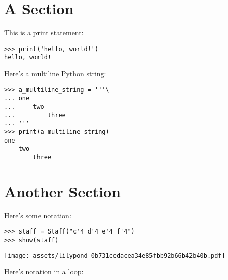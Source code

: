 \documentclass{article}
\begin{document}
\section{A Section}

This is a print statement:

\begin{comment}
<abjad>
print('hello, world!')
</abjad>
\end{comment}

\begin{singlespacing}
\begin{lstlisting}
>>> print('hello, world!')
hello, world!
\end{lstlisting}
\end{singlespacing}

Here's a multiline Python string:

\begin{comment}
<abjad>
a_multiline_string = '''\
one
    two
        three
'''
print(a_multiline_string)
</abjad>
\end{comment}

\begin{singlespacing}
\begin{lstlisting}
>>> a_multiline_string = '''\
... one
...     two
...         three
... '''
>>> print(a_multiline_string)
one
    two
        three
\end{lstlisting}
\end{singlespacing}

\section{Another Section}

Here's some notation:

\begin{comment}
<abjad>
staff = Staff("c'4 d'4 e'4 f'4")
show(staff)
</abjad>
\end{comment}

\begin{singlespacing}
\begin{lstlisting}
>>> staff = Staff("c'4 d'4 e'4 f'4")
>>> show(staff)
\end{lstlisting}
\noindent\texttt{[image: assets/lilypond-0b731cedacea34e85fbb92b66b42b40b.pdf]}
\end{singlespacing}

Here's notation in a loop:
\end{document}
